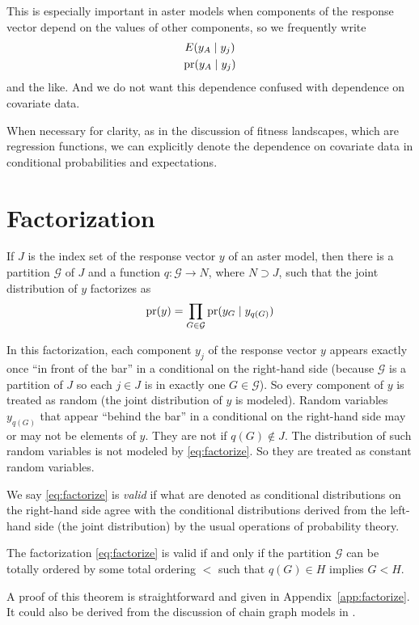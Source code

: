 This is especially important in aster models when components of the response
vector depend on the values of other components, so we frequently write
\begin{gather*}
   E(y_A \mid y_j)
   \\
   \operatorname{pr}(y_A \mid y_j)
\end{gather*}
and the like.  And we do not want this dependence confused with dependence
on covariate data.

When necessary for clarity, as in the discussion of fitness landscapes,
which are regression functions,
we can explicitly denote the dependence on covariate data in conditional
probabilities and expectations.

\section{Factorization}
\label{sec:factorization}

If $J$ is the index set of the response vector $y$ of an aster model,
then there is a partition $\mathcal{G}$ of $J$
and a function $q : \mathcal{G} \to N$, where $N \supset J$, such that
the joint distribution of $y$ factorizes as
\begin{equation} \label{eq:factorize}
   \operatorname{pr}(y) = \prod_{G \in \mathcal{G}} \operatorname{pr}(y_G \mid y_{q(G)})
\end{equation}

In this factorization, each component $y_j$ of the response vector $y$
appears exactly once ``in front of the bar'' in a conditional on
the right-hand side (because $\mathcal{G}$ is a partition of $J$ so
each $j \in J$ is in exactly one $G \in \mathcal{G}$).
So every component of $y$ is treated as random (the joint distribution
of $y$ is modeled).
Random variables $y_{q(G)}$ that appear ``behind the bar'' in a conditional
on the right-hand side may or may not be elements of $y$.  They are not
if $q(G) \notin J$.  The distribution of such random variables is not
modeled by \eqref{eq:factorize}.  So they are treated as constant random
variables.

We say \eqref{eq:factorize} is \emph{valid} if what are denoted as
conditional distributions on the right-hand side agree with the conditional
distributions derived from the left-hand side (the joint distribution) by
the usual operations of probability theory.
\begin{theorem} \label{th:factorize}
The factorization \eqref{eq:factorize} is valid if and only if
the partition $\mathcal{G}$ can be totally ordered
by some total ordering $<$ such that $q(G) \in H$ implies $G < H$.
\end{theorem}
A proof of this theorem is straightforward and given
in Appendix~\ref{app:factorize}.
It could also be derived from the discussion of chain graph models
in \citet[equation~3.23]{lauritzen}.

